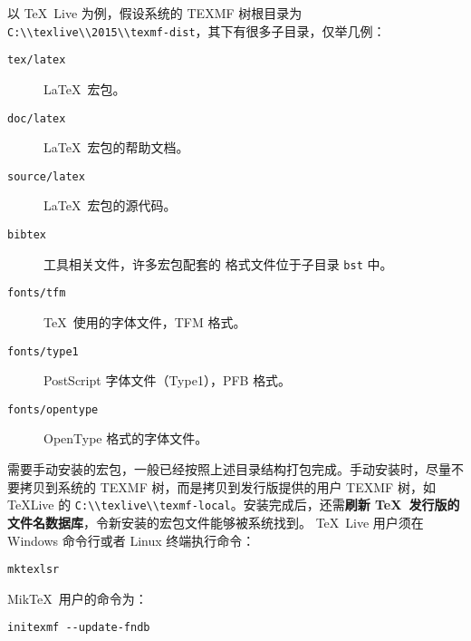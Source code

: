 以 \TeX\ Live 为例，假设系统的 TEXMF 树根目录为 \nolinkurl{C:\\texlive\\2015\\texmf-dist}，其下有很多子目录，仅举几例：
\begin{description}
  \item[\texttt{tex/latex}] \LaTeX\ 宏包。
  \item[\texttt{doc/latex}] \LaTeX\ 宏包的帮助文档。
  \item[\texttt{source/latex}] \LaTeX\ 宏包的源代码。
  \item[\texttt{bibtex}]  工具相关文件，许多宏包配套的  格式文件位于子目录 \texttt{bst} 中。
  \item[\texttt{fonts/tfm}] \TeX\ 使用的字体文件，TFM 格式。
  \item[\texttt{fonts/type1}] PostScript 字体文件（Type1），PFB 格式。
  \item[\texttt{fonts/opentype}] OpenType 格式的字体文件。
\end{description}

需要手动安装的宏包，一般已经按照上述目录结构打包完成。手动安装时，尽量不要拷贝到系统的 TEXMF 树，而是拷贝到发行版提供的用户 TEXMF 树，如
\TeX Live 的 \nolinkurl{C:\\texlive\\texmf-local}。安装完成后，还需\textbf{刷新 \TeX\ 发行版的文件名数据库}，令新安装的宏包文件能够被系统找到。
\TeX\ Live 用户须在 Windows 命令行或者 Linux 终端执行命令：
\begin{verbatim}
mktexlsr
\end{verbatim}
Mik\TeX\ 用户的命令为：
\begin{verbatim}
initexmf --update-fndb
\end{verbatim}

\endinput